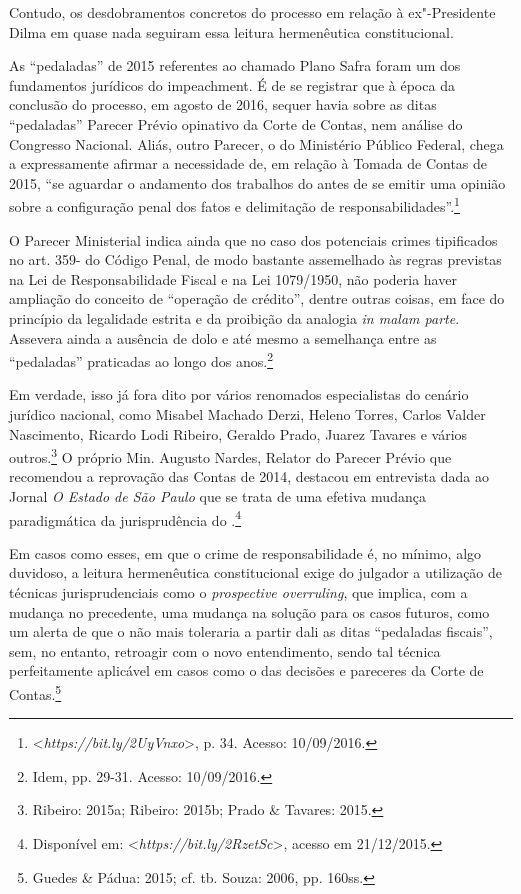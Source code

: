 Contudo, os desdobramentos concretos do processo em relação à
ex"-Presidente Dilma em quase nada seguiram essa leitura hermenêutica
constitucional.

As ``pedaladas'' de 2015 referentes ao chamado Plano Safra foram um dos
fundamentos jurídicos do impeachment. É de se registrar que à
época da conclusão do processo, em agosto de 2016, sequer havia sobre as
ditas ``pedaladas'' Parecer Prévio opinativo da Corte de Contas, nem
análise do Congresso Nacional. Aliás, outro Parecer, o do Ministério
Público Federal, chega a expressamente afirmar a necessidade de, em
relação à Tomada de Contas de 2015, ``se aguardar o andamento dos
trabalhos do  antes de se emitir uma opinião sobre a configuração
penal dos fatos e delimitação de responsabilidades''.\footnote{\textless{}\emph{https://bit.ly/2UyVnxo}\textgreater{}, p. 34. Acesso: 10/09/2016.}

O Parecer Ministerial indica ainda que no caso dos potenciais crimes
tipificados no art. 359- do Código Penal, de modo bastante assemelhado
às regras previstas na Lei de Responsabilidade Fiscal e na Lei
1079/1950, não poderia haver ampliação do conceito de ``operação de
crédito'', dentre outras coisas, em face do princípio da legalidade
estrita e da proibição da analogia \emph{in malam parte}. Assevera ainda
a ausência de dolo e até mesmo a semelhança entre as ``pedaladas''
praticadas ao longo dos anos.\footnote{Idem, pp. 29-31. Acesso: 10/09/2016.}

Em verdade, isso já fora dito por vários renomados especialistas do
cenário jurídico nacional, como Misabel Machado Derzi, Heleno Torres,
Carlos Valder Nascimento, Ricardo Lodi Ribeiro, Geraldo Prado, Juarez
Tavares e vários outros.\footnote{Ribeiro: 2015a; Ribeiro: 2015b; Prado \&
Tavares: 2015.} O próprio Min. Augusto Nardes, Relator do Parecer Prévio
que recomendou a reprovação das Contas de 2014, destacou em entrevista
dada ao Jornal \emph{O Estado de São Paulo} que se trata de uma efetiva
mudança paradigmática da jurisprudência do .\footnote{Disponível em: \textless{}\emph{https://bit.ly/2RzetSc}\textgreater{}, acesso em 21/12/2015.}

Em casos como esses, em que o crime de responsabilidade é, no mínimo,
algo duvidoso, a leitura hermenêutica constitucional exige do julgador a
utilização de técnicas jurisprudenciais como o \emph{prospective
overruling}, que implica, com a mudança no precedente, uma mudança na
solução para os casos futuros, como um alerta de que o  não mais
toleraria a partir dali as ditas ``pedaladas fiscais'', sem, no entanto,
retroagir com o novo entendimento, sendo tal técnica perfeitamente
aplicável em casos como o das decisões e pareceres da Corte de Contas.\footnote{Guedes \& Pádua: 2015; cf. tb. Souza: 2006, pp. 160ss.}

